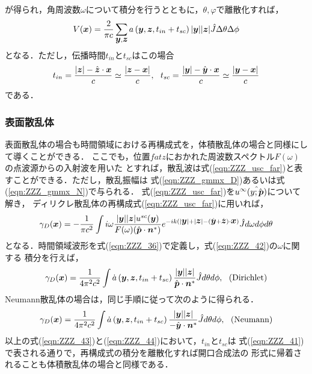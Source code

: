 が得られ，角周波数$\omega$について積分を行うとともに，$\theta,\varphi$で離散化すれば，
\begin{equation}
	V(\mbox{\boldmath $x$}) = 
	\frac{2}{\pi c} 
	\sum_{\mbox{\boldmath $y$},\mbox{\boldmath $z$}} 
	a\left(\mbox{\boldmath $y$}, \mbox{\boldmath $z$}, t_{in}+t_{sc} \right) 
	|\mbox{\boldmath $y$}| |\mbox{\boldmath $z$}|\hat{J} \Delta \theta \Delta \phi
	\label{eqn:ZZZ_40}
\end{equation}
となる．ただし，伝播時間$t_{in}$と$t_{sc}$はこの場合
\begin{equation}
	t_{in}=
	\frac{ |\mbox{\boldmath $z$}|-\hat{\mbox{\boldmath $z$}}\cdot \mbox{\boldmath $x$} }{c} \simeq 
	\frac{\left|\mbox{\boldmath $z$}-\mbox{\boldmath $x$}\right|}{c} 
	, \ \
	t_{sc}=
	\frac{ |\mbox{\boldmath $y$}|-\hat{\mbox{\boldmath $y$}}\cdot \mbox{\boldmath $x$} }{c} \simeq 
	\frac{\left|\mbox{\boldmath $y$}-\mbox{\boldmath $x$}\right|}{c} 
	\label{eqn:ZZZ_41}
\end{equation}
である．
\subsubsection{表面散乱体}
表面散乱体の場合も時間領域における再構成式を，体積散乱体の場合と同様にして導くことができる．
ここでも，位置$fat{z}$におかれた周波数スペクトル$F(\omega)$の点波源からの入射波を用いた
とすれば，散乱波は式(\ref{eqn:ZZZ_usc_far})と表すことができる．ただし，散乱振幅は
式(\ref{eqn:ZZZ_gmmx_D})あるいは式(\ref{eqn:ZZZ_gmmx_N})で与られる．
式(\ref{eqn:ZZZ_usc_far})を$u^{\infty}(\hat{\mbox{\boldmath $y$};\hat{\mbox{\boldmath $p$}}})$について解き，
ディリクレ散乱体の再構成式(\ref{eqn:ZZZ_usc_far})に用いれば，
\begin{equation}
	\gamma_D(\mbox{\boldmath $x$}) = -\frac{1}{\pi c^2} \int 
	i\omega
	\frac{|\mbox{\boldmath $y$}||\mbox{\boldmath $z$}|u^{sc}(\mbox{\boldmath $y$})}
	{F(\omega) (\hat{\mbox{\boldmath $p$}}\cdot\mbox{\boldmath $n$}^*) }
	e^{-ik(|\mbox{\boldmath $y$}|+|\mbox{\boldmath $z$}|-(\hat{\mbox{\boldmath $y$}}+\hat{\mbox{\boldmath $z$}})\cdot\mbox{\boldmath $x$}) }
	\hat{J} d\omega d\phi d\theta	
	\label{eqn:ZZZ_42}
\end{equation}
となる．時間領域波形を式(\ref{eqn:ZZZ_36})で定義し，式(\ref{eqn:ZZZ_42})の$\omega$に関する
積分を行えば，
\begin{equation}
	\gamma_D(\mbox{\boldmath $x$}) =\frac{1}{4\pi^2c^2} \int \dot{a}
	\left(\mbox{\boldmath $y$}, \mbox{\boldmath $z$}, t_{in}+t_{sc} \right) \frac{|\mbox{\boldmath $y$}| |\mbox{\boldmath $z$}|}{\hat{\mbox{\boldmath $p$}}\cdot\mbox{\boldmath $n$}^*} 
	\hat{J}
	d\theta d\phi, \ \ ({\rm Dirichlet})
	\label{eqn:ZZZ_43}
\end{equation}
Neumann散乱体の場合は，同じ手順に従って次のように得られる．
\begin{equation}
	\gamma_D(\mbox{\boldmath $x$}) =\frac{1}{4\pi^2c^2} \int \dot{a}
	\left(\mbox{\boldmath $y$}, \mbox{\boldmath $z$}, t_{in}+t_{sc} \right) \frac{|\mbox{\boldmath $y$}| |\mbox{\boldmath $z$}|}{-\hat{\mbox{\boldmath $y$}}\cdot\mbox{\boldmath $n$}^*} 
	\hat{J}
	d\theta d\phi, \ \ ({\rm Neumann})
	\label{eqn:ZZZ_44}
\end{equation}
以上の式(\ref{eqn:ZZZ_43})と(\ref{eqn:ZZZ_44})において，$t_{in}$と$t_{sc}$は
式(\ref{eqn:ZZZ_41})で表される通りで，再構成式の積分を離散化すれば開口合成法の
形式に帰着されることも体積散乱体の場合と同様である．
